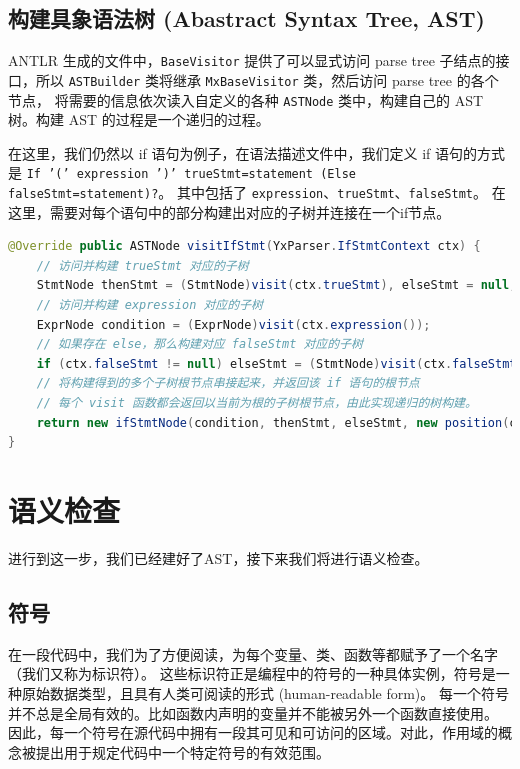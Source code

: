 \subsection{构建具象语法树 (Abastract Syntax Tree, AST)}
ANTLR 生成的文件中，\texttt{BaseVisitor} 提供了可以显式访问 parse tree 子结点的接口，所以
\texttt{ASTBuilder} 类将继承 \texttt{MxBaseVisitor} 类，然后访问 parse tree 的各个节点，
将需要的信息依次读入自定义的各种 \texttt{ASTNode} 类中，构建自己的 AST 树。构建 AST 的过程是一个递归的过程。

在这里，我们仍然以 if 语句为例子，在语法描述文件中，我们定义 if 语句的方式是 \texttt{If '(' expression ')' trueStmt=statement (Else falseStmt=statement)?}。
其中包括了 \texttt{expression}、\texttt{trueStmt}、\texttt{falseStmt}。
在这里，需要对每个语句中的部分构建出对应的子树并连接在一个if节点。
\begin{lstlisting}[language=Java]
@Override public ASTNode visitIfStmt(YxParser.IfStmtContext ctx) {
    // 访问并构建 trueStmt 对应的子树
    StmtNode thenStmt = (StmtNode)visit(ctx.trueStmt), elseStmt = null;
    // 访问并构建 expression 对应的子树
    ExprNode condition = (ExprNode)visit(ctx.expression());
    // 如果存在 else，那么构建对应 falseStmt 对应的子树
    if (ctx.falseStmt != null) elseStmt = (StmtNode)visit(ctx.falseStmt);
    // 将构建得到的多个子树根节点串接起来，并返回该 if 语句的根节点
    // 每个 visit 函数都会返回以当前为根的子树根节点，由此实现递归的树构建。
    return new ifStmtNode(condition, thenStmt, elseStmt, new position(ctx));
}
\end{lstlisting}


\section{语义检查}
进行到这一步，我们已经建好了AST，接下来我们将进行语义检查。

\subsection{符号}
在一段代码中，我们为了方便阅读，为每个变量、类、函数等都赋予了一个名字（我们又称为标识符）。
这些标识符正是编程中的符号的一种具体实例，符号是一种原始数据类型，且具有人类可阅读的形式 (human-readable form)。
每一个符号并不总是全局有效的。比如函数内声明的变量并不能被另外一个函数直接使用。
因此，每一个符号在源代码中拥有一段其可见和可访问的区域。对此，作用域的概念被提出用于规定代码中一个特定符号的有效范围。


